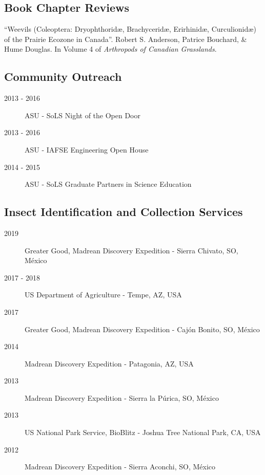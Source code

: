 \documentclass[12pt,a4paper]{article}
\begin{document}
	\subsection*{Book Chapter Reviews}
		\begin{description}
			\item ``Weevils (Coleoptera: Dryophthorid\ae, Brachycerid\ae, Erirhinid\ae, Curculionid\ae) of the Prairie Ecozone in Canada''.
					Robert S. Anderson, Patrice Bouchard, \& Hume Douglas.
					In Volume 4 of \textit{Arthropods of Canadian Grasslands}.
		\end{description}

	\subsection*{Community Outreach}
		\begin{description}
			\item [2013 - 2016] ASU - SoLS Night of the Open Door
			\item [2013 - 2016] ASU - IAFSE Engineering Open House
			\item [2014 - 2015] ASU - SoLS Graduate Partners in Science Education
		\end{description}
		
	\subsection*{Insect Identification and Collection Services}
		\begin{description}
			\item [2019] Greater Good, Madrean Discovery Expedition - Sierra Chivato, SO, M\'{e}xico
			\item [2017 - 2018] US Department of Agriculture - Tempe, AZ, USA
			\item [2017] Greater Good, Madrean Discovery Expedition - Caj\'{o}n Bonito, SO, M\'{e}xico
			\item [2014] Madrean Discovery Expedition - Patagonia, AZ, USA
			\item [2013] Madrean Discovery Expedition - Sierra la P\'{u}rica, SO, M\'{e}xico
			\item [2013] US National Park Service, BioBlitz - Joshua Tree National Park, CA, USA
			\item [2012] Madrean Discovery Expedition - Sierra Aconchi, SO, M\'{e}xico
		\end{description}
	
\end{document}

